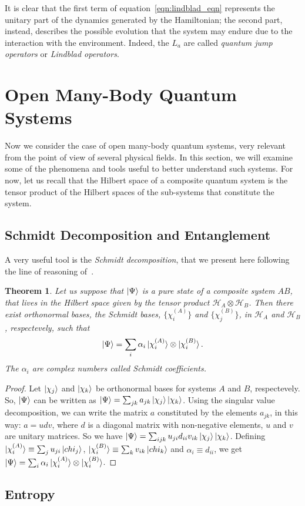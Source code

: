 It is clear that the first term of equation~\ref{eqn:lindblad_eqn} represents the unitary part of the dynamics generated by the Hamiltonian; the second part, instead, describes the possible evolution that the system may endure due to the interaction with the environment. Indeed, the $L_a$ are called \emph{quantum jump operators} or \emph{Lindblad operators}.



\section{Open Many-Body Quantum Systems}
Now we consider the case of open many-body quantum systems, very relevant from the point of view of several physical fields. In this section, we will examine some of the phenomena and tools useful to better understand such systems. For now, let us recall that the Hilbert space of a composite quantum system is the tensor product of the Hilbert spaces of the sub-systems that constitute the system.

\subsection{Schmidt Decomposition and Entanglement}
A very useful tool is the \emph{Schmidt decomposition}, that we present here following the line of reasoning of~\cite{nielsen_chuang}.
\newtheorem{theo}{Theorem}[section]
\begin{theo}
    Let us suppose that $\ket{\Psi}$ is a pure state of a composite system $AB$, that lives in the Hilbert space given by the tensor product $\mathcal{H}_A \otimes \mathcal{H}_B$. Then there exist orthonormal bases, the Schmidt bases, $\{\chi_i^{(A)}\}$ and $\{\chi_j^{(B)}\}$, in $\mathcal{H}_A$ and $\mathcal{H}_B$, respectevely, such that
    \begin{equation}
        \ket{\Psi} = \sum_i \alpha_i \ket{\chi_i^{(A)}}\otimes \ket{\chi_i^{(B)}}.
    \end{equation}
    The $\alpha_i$ are complex numbers called Schmidt coefficients.
\end{theo}
\begin{proof}
Let $\ket{\chi_j}$ and $\ket{\chi_k}$ be orthonormal bases for systems $A$ and $B$, respectevely. So, $\ket{\Psi}$ can be written as $\ket{\Psi} = \sum_{jk} a_{jk}\ket{\chi_j}\ket{\chi_k}$. Using the singular value decomposition, we can write the matrix $a$ constituted by the elements $a_{jk}$, in this way: $a = udv$, where $d$ is a diagonal matrix with non-negative elements, $u$ and $v$ are unitary matrices. So we have $\ket{\Psi} = \sum_{ijk} u_{ji}d_{ii}v_{ik} \ket{\chi_j}\ket{\chi_k}$.
Defining $\ket{\chi_i^{(A)}} \equiv \sum_j u_{ji}\ket{chi_j}$, $\ket{\chi_i^{(B)}} \equiv \sum_k v_{ik}\ket{chi_k}$ and $\alpha_i \equiv d_{ii}$, we get $\ket{\Psi} = \sum_i \alpha_i \ket{\chi_i^{(A)}}\otimes \ket{\chi_i^{(B)}}$.
\end{proof}



\subsection{Entropy}
